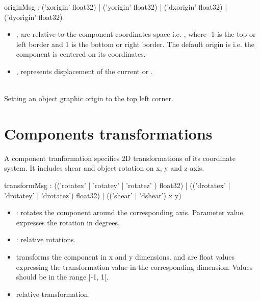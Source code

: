 \documentclass[a4paper,twoside]{report}
\newcommand{\sublevel}[1]	{\section{#1}}
\begin{document}

\begin{rail}
originMsg :  
			('xorigin' float32)
		| 	('yorigin' float32)
		| 	('dxorigin' float32)
		| 	('dyorigin' float32)
\end{rail}

\begin{itemize}
\item {},  are relative to the component coordinates space i.e. , where -1 is the top or left border and 1 is the bottom or right border. The default origin is  i.e. the component is centered on its  coordinates.
\item {},  represents displacement of the current  or .
\end{itemize}

\example \\
Setting an object graphic origin to the top left corner.

\sublevel{Components transformations}
\label{transform}

A component tranformation specifies 2D transformations of its coordinate system. It includes shear and object rotation on x, y and z axis.


\begin{rail}
transformMsg :
			(('rotatex' | 'rotatey' | 'rotatez' ) float32)
		|	(('drotatex' | 'drotatey' | 'drotatez') float32)
		| 	(('shear' | 'dshear') x y) 
\end{rail}

\begin{itemize}
\item {}: rotates the component around the corresponding axis. Parameter value expresses the rotation in degrees.
\item {}: relative rotations.
\item {} transforms the component in x and y dimensions.  and  are float values expressing the transformation value in the corresponding dimension. Values should be in the range ]-1, 1[.
\item {} relative  transformation.
\end{itemize}
\end{document}
